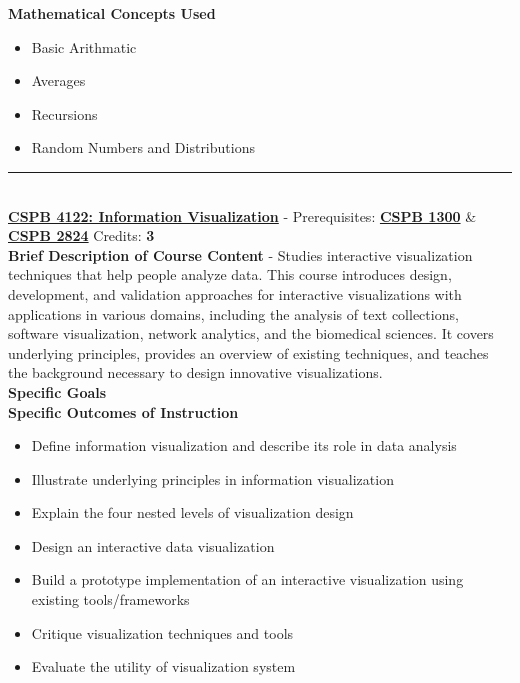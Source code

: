 \documentclass{article}
\newcommand{\horizontalline}{\noindent \rule{\textwidth}{0.5pt} \\}
\begin{document}
\noindent \textbf{Mathematical Concepts Used}
\begin{itemize}
    \item Basic Arithmatic
    \item Averages
    \item Recursions
    \item Random Numbers and Distributions
\end{itemize}
\horizontalline
\noindent \href{https://www.colorado.edu/program/cspb/cspb-4122-information-visualization}{\textbf{CSPB 4122: Information Visualization}} - Prerequisites: \href{https://www.colorado.edu/program/cspb/cspb-1300-computer-science-1-starting-computing}{\textbf{CSPB 1300}} \& \href{https://www.colorado.edu/program/cspb/cspb-2824-discrete-structures}{\textbf{CSPB 2824}} Credits: \textbf{3} \\

\noindent \textbf{Brief Description of Course Content} - Studies interactive visualization techniques that help people analyze data. This course introduces design, development, and validation approaches for interactive visualizations with applications in various domains, including the analysis of text collections, software visualization, network analytics, and the biomedical sciences. It covers underlying principles, provides an overview of existing techniques, and teaches the background necessary to design innovative visualizations. \\

\noindent \textbf{Specific Goals} \\

\noindent \textbf{Specific Outcomes of Instruction}
\begin{itemize}
    \item Define information visualization and describe its role in data analysis
    \item Illustrate underlying principles in information visualization
    \item Explain the four nested levels of visualization design
    \item Design an interactive data visualization
    \item Build a prototype implementation of an interactive visualization using existing tools/frameworks
    \item Critique visualization techniques and tools
    \item Evaluate the utility of visualization system
\end{itemize}
\end{document}
